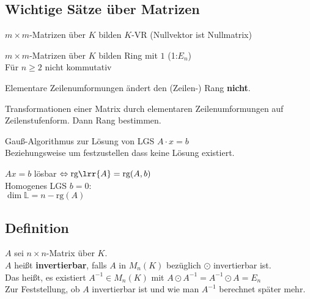\subsection{Wichtige Sätze über Matrizen}
		\item $m\times m$-Matrizen über $K$ bilden $K$-VR (Nullvektor ist Nullmatrix)
		\item $m\times m$-Matrizen über $K$ bilden Ring mit $1$ (1:$E_n$)\\
			Für $n\geq 2$ nicht kommutativ
		\item Elementare Zeilenumformungen ändert den (Zeilen-) Rang \textbf{nicht}.
		\item Transformationen einer Matrix durch elementaren Zeilenumformungen auf \\
			Zeilenstufenform. Dann Rang bestimmen.
		\item Gauß-Algorithmus zur Lösung von LGS $A\cdot x=b$\\
			Beziehungsweise um festzustellen dass keine Lösung existiert.
		\item $Ax=b$ lösbar $\Leftrightarrow \mbox{rg}\lrr{A}=\mbox{rg}(A,b)$\\
			Homogenes LGS $b=0$:\\
			$\dim\mathbb{L}=n-\mbox{rg}(A)$
	\subExEnd
	
\subsection{Definition}
	$A$ sei $n\times n$-Matrix über $K$.\\
	$A$ heißt \textbf{invertierbar}, falls $A$ in $M_n(K)$ bezüglich $\odot$ invertierbar ist.\\
	Das heißt, es existiert $A^{-1}\in M_n(K)$ mit $A\odot A^{-1}=A^{-1}\odot A=E_n$\\
	Zur Feststellung, ob $A$ invertierbar ist und wie man $A^{-1}$ berechnet später mehr.